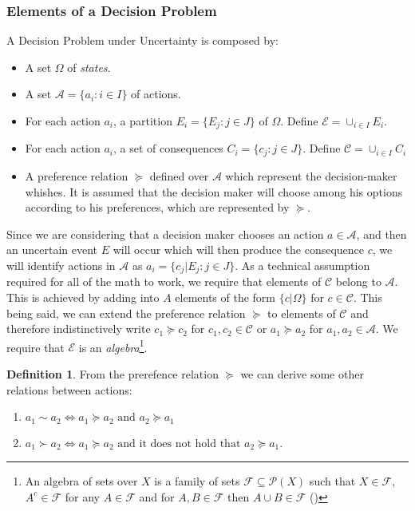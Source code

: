 \documentclass[english,letterpaper,12pt,final]{article}
\theoremstyle{definition}
\newtheorem{defi}{Definition}[section]
\begin{document}
	\subsubsection{Elements of a Decision Problem}
	A Decision Problem under Uncertainty is composed by:
	\begin{itemize}
	\item A set $\Omega$ of \textit{states}.
	\item A set $\mathcal{A}=\{a_i : i \in I \}$ of actions.
	\item For each action $a_i$, a partition $E_i = \{ E_j : j \in J \}$ of $\Omega$. Define $\mathcal{E} = \cup_{i \in I } E_i$.
	\item For each action $a_i$, a set of consequences $C_i = \{ c_j : j \in J \}$. Define $\mathcal{C}=\cup_{i \in I} C_i$
	\item A preference relation $\succeq$ defined over $\mathcal{A}$ which represent the decision-maker whishes. It is assumed that the decision maker will choose among his options according to his preferences, which are represented by $\succeq$.
	\end{itemize}
	Since we are considering that a decision maker chooses an action $a \in \mathcal{A}$, and then an uncertain event $E$ will occur which will then produce the consequence $c$, we will identify actions in $\mathcal{A}$ as $a_i = \{ c_j | E_j : j \in J \}$. As a technical assumption required for all of the math to work, we require that elements of $\mathcal{C}$ belong to $\mathcal{A}$. This is achieved by adding into $A$ elements of the form $\{ c | \Omega \}$ for $c \in \mathcal{C}$. This being said, we can extend the preference relation $\succeq$ to elements of $\mathcal{C}$ and therefore indistinctively write $c_1 \succeq c_2$ for $c_1, c_2 \in \mathcal{C}$ or $a_1 \succeq a_2$ for $a_1,a_2 \in \mathcal{A}$. We require that $\mathcal{E}$ is an \textit{algebra}\footnote{An algebra of sets over $X$ is a family of sets $\mathcal{F} \subseteq \mathcal{P}(X)$ such that $X \in \mathcal{F}$, $A^c \in \mathcal{F}$ for any $A \in \mathcal{F}$ and for $A,B \in \mathcal{F}$ then $A \cup B \in \mathcal{F}$ (\cite{ash2000probability})}.	
	\begin{defi}
	From the prerefence relation $\succeq$ we can derive some other relations between actions:
	\begin{enumerate}[label=(\roman*)]
	\item $a_1 \sim a_2 \Leftrightarrow a_1 \succeq a_2 \textrm{ and } a_2 \succeq a_1$
	\item $a_1 \succ a_2 \Leftrightarrow a_1 \succeq a_2 \textrm{ and it does not hold that } a_2 \succeq a_1$.
	\end{enumerate}
	\end{defi}
\end{document}
